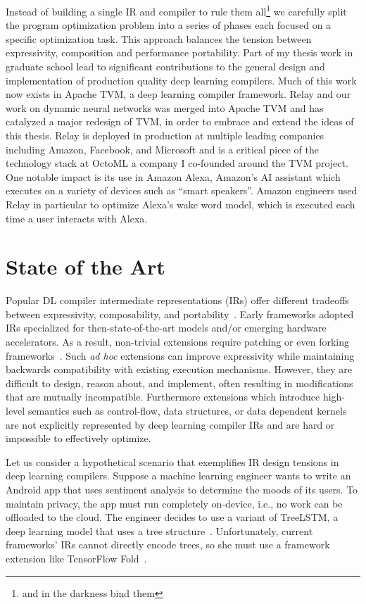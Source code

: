 Instead of building a single IR and compiler to rule them all\footnote{and in the darkness bind them}
  we carefully split the program optimization problem into a series of
  phases each focused on a specific optimization task.
This approach balances the tension between expressivity, composition
  and performance portability.
Part of my thesis work in graduate school
  lead to significant contributions to the general design and implementation of
  production quality deep learning compilers.
Much of this work now exists in Apache TVM, a deep learning compiler framework.
Relay and our work on dynamic neural networks was merged into Apache TVM and
  has catalyzed a major redesign of TVM, in order to embrace and extend the ideas of this thesis.
Relay is deployed in production at multiple leading companies including
  Amazon, Facebook, and Microsoft and is a critical piece of the technology stack
  at OctoML a company I co-founded around the TVM project.
One notable impact is its use in Amazon Alexa, Amazon's AI assistant
  which executes on a variety of devices such as ``smart speakers''.
Amazon engineers used Relay in particular to optimize Alexa’s wake word model, which
  is executed each time a user interacts with Alexa.

\section{State of the Art}

Popular DL compiler intermediate representations (IRs) offer different tradeoffs
  between expressivity, composability, and portability~\citep{
    tensorflow, pytorch_ad, chainer_learningsys2015, tangent, theano, glow}.
Early frameworks adopted IRs
  specialized for then-state-of-the-art models and/or
  emerging hardware accelerators.
As a result, non-trivial extensions require
  patching or even forking frameworks~\citep{
    tf_fold, tf_lite, tangent, tf_eager, xla, glow, torchscript}.
Such \textit{ad hoc} extensions can improve expressivity
  while maintaining backwards compatibility with existing execution mechanisms.
However, they are difficult to design, reason about, and implement,
  often resulting in modifications that are mutually incompatible.
Furthermore extensions which introduce high-level semantics
  such as control-flow, data structures, or data dependent kernels
  are not explicitly represented by deep learning compiler IRs
  and are hard or impossible to effectively optimize.

Let us consider a hypothetical scenario that exemplifies
  IR design tensions in deep learning compilers.
Suppose a machine learning engineer wants to write
  an Android app that uses sentiment analysis to
  determine the moods of its users.
To maintain privacy, the app must run completely on-device,
  i.e., no work can be offloaded to the cloud.
The engineer decides to use a variant of TreeLSTM,
  a deep learning model that uses a tree structure~\citep{tree_lstm}.
Unfortunately, current frameworks' IRs cannot directly encode trees,
  so she must use a framework extension
  like TensorFlow Fold~\citep{tensorflowfold}.

